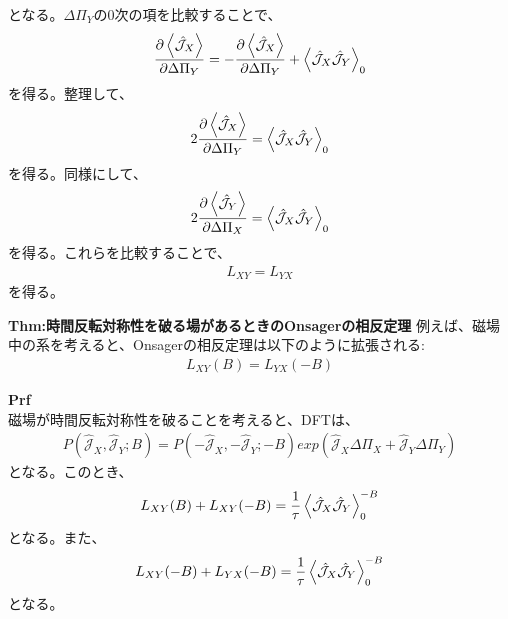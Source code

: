\documentclass[a4paper,11pt]{jsarticle}
\begin{document}
となる。$\Delta \Pi_Y$の0次の項を比較することで、
\begin{align}
    \pdv{\ev{\hat{\mathcal{J}}_X}}{\Delta \Pi_Y} = -\pdv{\ev{\hat{\mathcal{J}}_X}}{\Delta \Pi_Y} + \ev{\hat{\mathcal{J}}_X \hat{\mathcal{J}}_Y}_0
\end{align}
を得る。整理して、
\begin{align}
    2\pdv{\ev{\hat{\mathcal{J}}_X}}{\Delta \Pi_Y} = \ev{\hat{\mathcal{J}}_X \hat{\mathcal{J}}_Y}_0
\end{align}
を得る。同様にして、
\begin{align}
    2\pdv{\ev{\hat{\mathcal{J}}_Y}}{\Delta \Pi_X} = \ev{\hat{\mathcal{J}}_X \hat{\mathcal{J}}_Y}_0
\end{align}
を得る。これらを比較することで、
\begin{align}
    L_{XY} = L_{YX}
\end{align}
を得る。\hfill \qedsymbol

\begin{itembox}[l]{\textbf{Thm:時間反転対称性を破る場があるときのOnsagerの相反定理}}
    例えば、磁場中の系を考えると、Onsagerの相反定理は以下のように拡張される:
    \begin{align}
        L_{XY} (B) = L_{YX} (-B)
    \end{align}
\end{itembox}
\textbf{Prf}\\
磁場が時間反転対称性を破ることを考えると、DFTは、
\begin{align}
    P(\hat{\mathcal{J}}_X, \hat{\mathcal{J}}_Y;B) = P(-\hat{\mathcal{J}}_X, -\hat{\mathcal{J}}_Y;-B)exp(\hat{\mathcal{J}}_X \Delta \Pi_X + \hat{\mathcal{J}}_Y \Delta \Pi_Y)
\end{align}
となる。このとき、
\begin{align}
    L_{XY} (B) + L_{XY} (-B) = \frac{1}{\tau} \ev{\hat{\mathcal{J}}_X \hat{\mathcal{J}}_Y}_0^{-B}
\end{align}
となる。また、
\begin{align}
    L_{XY} (-B) + L_{YX} (-B) = \frac{1}{\tau} \ev{\hat{\mathcal{J}}_X \hat{\mathcal{J}}_Y}_0^{-B}
\end{align}
となる。
\end{document}
